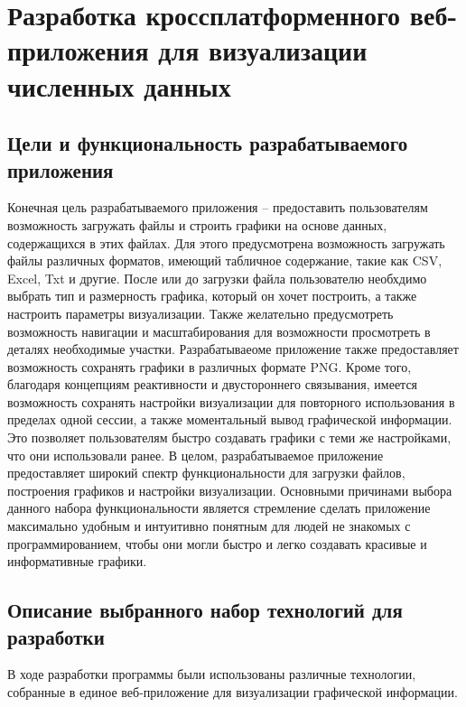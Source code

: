 \chapter{Разработка кроссплатформенного веб-приложения для визуализации численных данных}
\section{Цели и функциональность разрабатываемого приложения}
Конечная цель разрабатываемого приложения -- предоставить пользователям возможность загружать файлы и строить графики на основе данных, содержащихся в этих файлах. Для этого предусмотрена возможность загружать файлы различных форматов, имеющий табличное содержание, такие как CSV, Excel, Txt и другие.
После или до загрузки файла пользователю необхдимо выбрать тип и размерность графика, который он хочет построить, а также настроить параметры визуализации. Также желательно предусмотреть возможность навигации и масштабирования для возможности просмотреть в деталях необходимые участки. Разрабатываеоме приложение также предоставляет возможность сохранять графики в различных формате PNG.
Кроме того, благодаря концепциям реактивности и двустороннего связывания, имеется возможность сохранять настройки визуализации для повторного использования в пределах одной сессии, а также моментальный вывод графической информации. Это позволяет пользователям быстро создавать графики с теми же настройками, что они использовали ранее.
В целом, разрабатываемое приложение предоставляет широкий спектр функциональности для загрузки файлов, построения графиков и настройки визуализации. Основными причинами выбора данного набора функциональности является стремление сделать приложение максимально удобным и интуитивно понятным для людей не знакомых с программированием, чтобы они могли быстро и легко создавать красивые и информативные графики.
\section{Описание выбранного набор технологий для разработки}
В ходе разработки программы были использованы различные технологии, собранные в единое веб-приложение для визуализации графической информации.


